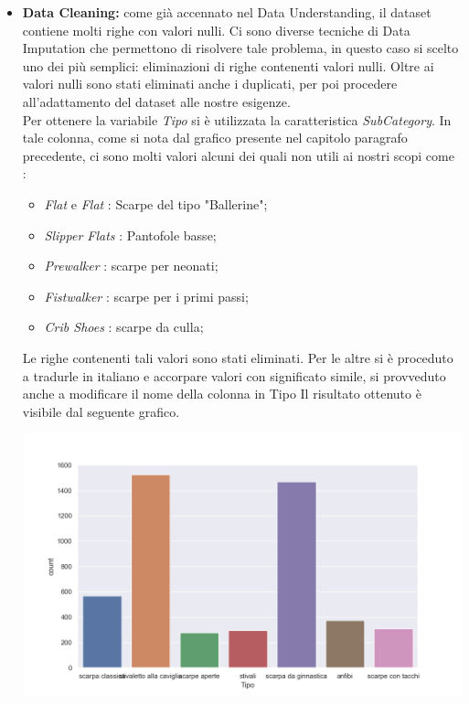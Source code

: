 \documentclass[a4paper, 11pt, oneside]{report}
\begin{document}
                \begin{itemize}
                    \item \textbf{Data Cleaning:} come già accennato nel Data Understanding, il dataset contiene molti righe con valori nulli.
                    Ci sono diverse tecniche di Data Imputation che permettono di risolvere tale problema,
                    in questo caso si scelto uno dei più semplici: eliminazioni di righe contenenti valori nulli.
                    Oltre ai valori nulli sono stati eliminati anche i duplicati, per poi procedere all'adattamento
                    del dataset alle nostre esigenze.\\
                    Per ottenere la variabile \emph{Tipo} si è utilizzata la caratteristica \emph{SubCategory}.
                    In tale colonna, come si nota dal grafico presente nel capitolo paragrafo precedente, ci sono molti valori
                    alcuni dei quali non utili ai nostri scopi come :
                    \begin{itemize}
                        \item \emph{Flat} e \emph{Flat} : Scarpe del tipo "Ballerine";
                        \item \emph{Slipper Flats} : Pantofole basse;
                        \item \emph{Prewalker} : scarpe per neonati;
                        \item \emph{Fistwalker} : scarpe per i primi passi;
                        \item \emph{Crib Shoes} : scarpe da culla;
                    \end{itemize}
                    Le righe contenenti tali valori sono stati eliminati.
                    Per le altre si è proceduto a tradurle in italiano e accorpare valori con significato simile,
                    si provveduto anche a modificare il nome della colonna in Tipo
                    Il risultato ottenuto è visibile dal seguente grafico.
                    \begin{center}
                        \includegraphics[scale=0.4]{countTipoShoes}

\end{center}
\end{itemize}
\end{document}
